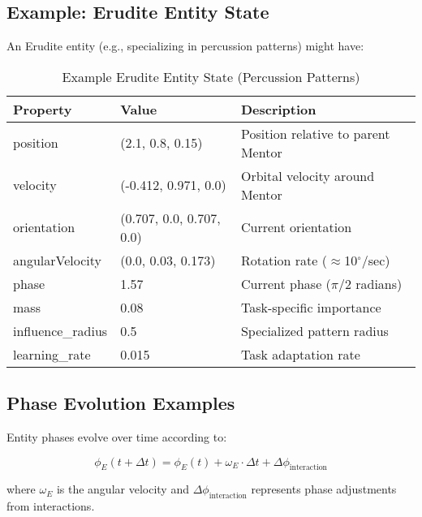 \subsection{Example: Erudite Entity State}

An Erudite entity (e.g., specializing in percussion patterns) might have:

\begin{table}[h]
\centering
\begin{tabular}{|l|l|l|}
\hline
\textbf{Property} & \textbf{Value} & \textbf{Description} \\
\hline
position & (2.1, 0.8, 0.15) & Position relative to parent Mentor \\
velocity & (-0.412, 0.971, 0.0) & Orbital velocity around Mentor \\
orientation & (0.707, 0.0, 0.707, 0.0) & Current orientation \\
angularVelocity & (0.0, 0.03, 0.173) & Rotation rate ($\approx$10$^{\circ}$/sec) \\
phase & 1.57 & Current phase ($\pi$/2 radians) \\
mass & 0.08 & Task-specific importance \\
influence\_radius & 0.5 & Specialized pattern radius \\
learning\_rate & 0.015 & Task adaptation rate \\
\hline
\end{tabular}
\caption{Example Erudite Entity State (Percussion Patterns)}
\end{table}

\subsection{Phase Evolution Examples}

Entity phases evolve over time according to:

\begin{equation}
\phi_E(t+\Delta t) = \phi_E(t) + \omega_E \cdot \Delta t + \Delta \phi_{\text{interaction}}
\end{equation}

where $\omega_E$ is the angular velocity and $\Delta \phi_{\text{interaction}}$ represents phase adjustments from interactions.

